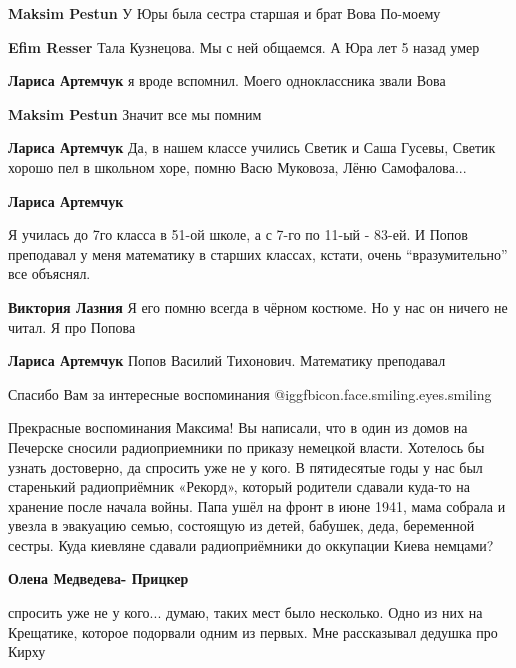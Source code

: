 \begin{itemize}
\begin{itemize}
\begin{itemize}
\textbf{Maksim Pestun}
У Юры была сестра старшая и брат Вова
По-моему

\textbf{Efim Resser}
Тала Кузнецова. Мы с ней общаемся.
А Юра лет 5 назад умер

\textbf{Лариса Артемчук} я вроде вспомнил. Моего одноклассника звали Вова

\textbf{Maksim Pestun}
Значит все мы помним
\end{itemize} %

\textbf{Лариса Артемчук}
Да, в нашем классе учились Светик и Саша Гусевы, Светик хорошо пел в школьном
хоре, помню Васю Муковоза, Лёню Самофалова...

\textbf{Лариса Артемчук} 

Я училась до 7го класса в 51-ой школе, а с 7-го по 11-ый - 83-ей. И Попов
преподавал у меня математику в старших классах, кстати, очень \enquote{вразумительно}
все объяснял.

\textbf{Виктория Лазния}
Я его помню всегда в чёрном костюме. Но у нас он ничего не читал. Я про Попова

\textbf{Лариса Артемчук} Попов Василий Тихонович. Математику преподавал

\end{itemize} %

Спасибо Вам за интересные воспоминания @igg{fbicon.face.smiling.eyes.smiling} 


Прекрасные воспоминания Максима! Вы написали, что в один из домов на Печерске
сносили радиоприемники по приказу немецкой власти. Хотелось бы узнать
достоверно, да спросить уже не у кого. В пятидесятые годы у нас был старенький
радиоприёмник «Рекорд», который родители сдавали куда-то на хранение после
начала войны. Папа ушёл на фронт в июне 1941, мама собрала и увезла в эвакуацию
семью, состоящую из детей, бабушек, деда, беременной сестры. Куда киевляне
сдавали радиоприёмники до оккупации Киева немцами?

\begin{itemize} %
\textbf{Олена Медведева- Прицкер} 

спросить уже не у кого... думаю, таких мест было несколько. Одно из них на
Крещатике, которое подорвали одним из первых. Мне рассказывал дедушка про Кирху


\end{itemize}
\end{itemize}
